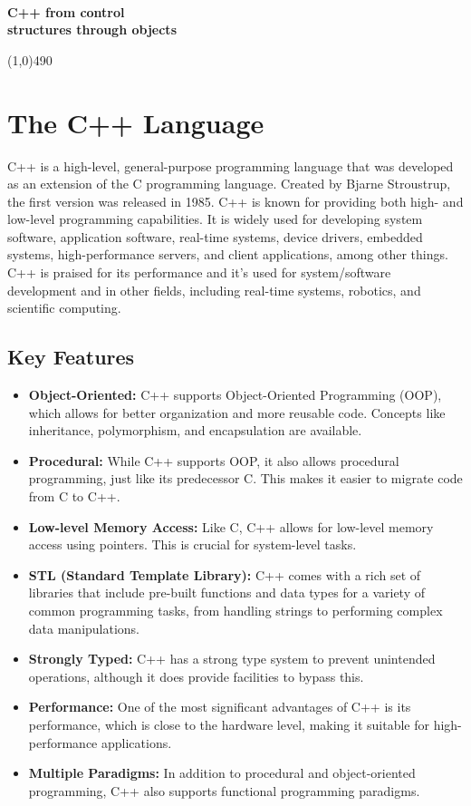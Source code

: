 \documentclass{report}
\begin{document}
    \pagebreak \bigbreak \noindent 
    \vspace{2.2in} \\
    \begin{Huge}
        \textbf{C++ from control \\ structures through objects}
    \end{Huge}
    \bigbreak \noindent 
    \line(1,0){490}
    \bigbreak \noindent 
    \section{\LARGE The C++ Language}
    \bigbreak \noindent 
    C++ is a high-level, general-purpose programming language that was developed as an extension of the C programming language. Created by Bjarne Stroustrup, the first version was released in 1985. C++ is known for providing both high- and low-level programming capabilities. It is widely used for developing system software, application software, real-time systems, device drivers, embedded systems, high-performance servers, and client applications, among other things. C++ is praised for its performance and it's used for system/software development and in other fields, including real-time systems, robotics, and scientific computing.
    \bigbreak \noindent 
    \subsection{Key Features}
    \bigbreak \noindent 
    \begin{itemize}
        \item \textbf{Object-Oriented:} C++ supports Object-Oriented Programming (OOP), which allows for better organization and more reusable code. Concepts like inheritance, polymorphism, and encapsulation are available.
        \item \textbf{Procedural:} While C++ supports OOP, it also allows procedural programming, just like its predecessor C. This makes it easier to migrate code from C to C++.
        \item \textbf{Low-level Memory Access:} Like C, C++ allows for low-level memory access using pointers. This is crucial for system-level tasks.
        \item \textbf{STL (Standard Template Library):} C++ comes with a rich set of libraries that include pre-built functions and data types for a variety of common programming tasks, from handling strings to performing complex data manipulations.
        \item \textbf{Strongly Typed:} C++ has a strong type system to prevent unintended operations, although it does provide facilities to bypass this.
        \item \textbf{Performance:} One of the most significant advantages of C++ is its performance, which is close to the hardware level, making it suitable for high-performance applications.
        \item \textbf{Multiple Paradigms:} In addition to procedural and object-oriented programming, C++ also supports functional programming paradigms.
    \end{itemize}
\end{document}
